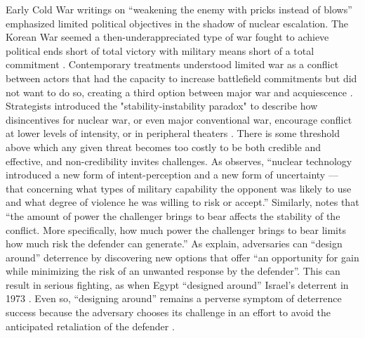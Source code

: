 \documentclass[bibtex, autowc]{apsr_submission}
\begin{document}
Early Cold War writings on “weakening the enemy with pricks instead of blows” \citep[186]{hart_strategyindirectapproach_1954} emphasized limited political objectives in the shadow of nuclear escalation. The Korean War seemed a then-underappreciated type of war fought to achieve political ends short of total victory with military means short of a total commitment \citep{osgood_reappraisallimitedwar_1969}. Contemporary treatments understood limited war as a conflict between actors that had the capacity to increase battlefield commitments but did not want to do so, creating a third option between major war and acquiescence \citep{brodie_morelimitedwar_1957, kissinger_strategyorganization_1957}. Strategists introduced the "stability-instability paradox" to describe how disincentives for nuclear war, or even major conventional war, encourage conflict at lower levels of intensity, or in peripheral theaters \citep{jervis_illogicamericannuclear_1984, sagan_spreadnuclearweapons_2003}. There is some threshold above which any given threat becomes too costly to be both credible and effective, and non-credibility invites challenges. As \citet[167]{snyder_balancepowerbalance_1965} observes, “nuclear technology introduced a new form of intent-perception and a new form of uncertainty — that concerning what types of military capability the opponent was likely to use and what degree of violence he was willing to risk or accept.” Similarly, \citet[598]{powell_nuclearbrinkmanshiplimited_2015} notes that “the amount of power the challenger brings to bear affects the stability of the conflict. More specifically, how much power the challenger brings to bear limits how much risk the defender can generate.” As \citet[173]{george_deterrenceforeignpolicy_1989} explain, adversaries can ``design around'' deterrence by discovering new options that offer “an opportunity for gain while minimizing the risk of an unwanted response by the defender”. This can result in serious fighting, as when Egypt “designed around” Israel’s deterrent in 1973 \citep{stein_calculationmiscalculationconventional_1989}. Even so, “designing around” remains a perverse symptom of deterrence success because the adversary chooses its challenge in an effort to avoid the anticipated retaliation of the defender \citep{lieberman_reconceptualizingdeterrencenudging_2012}.
\end{document}
